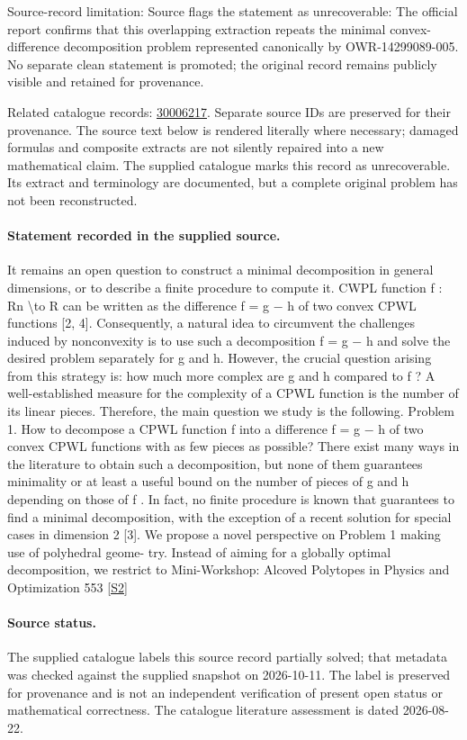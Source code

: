 \documentclass[11pt]{article}
\begin{document}
Source-record limitation: Source flags the statement as unrecoverable: The official report confirms that this overlapping extraction repeats the minimal convex-difference decomposition problem represented canonically by OWR-14299089-005. No separate clean statement is promoted; the original record remains publicly visible and retained for provenance.

Related catalogue records: \href{https://mehmetmars7.github.io/Erdosproblems-llm-hunter/problem.html?type=open_problems&id=30006217}{30006217}. Separate source IDs are preserved for their provenance.
The source text below is rendered literally where necessary; damaged formulas and composite extracts are not silently repaired into a new mathematical claim.
The supplied catalogue marks this record as unrecoverable. Its extract and terminology are documented, but a complete original problem has not been reconstructed.
\paragraph{Statement recorded in the supplied source.}
It remains an open question to construct a minimal decomposition in general dimensions, or to describe a finite procedure to compute it. CWPL function f : Rn \textbackslash{}to R can be written as the difference f = g − h of two convex CPWL functions [2, 4]. Consequently, a natural idea to circumvent the challenges induced by nonconvexity is to use such a decomposition f = g − h and solve the desired problem separately for g and h. However, the crucial question arising from this strategy is: how much more complex are g and h compared to f ? A well-established measure for the complexity of a CPWL function is the number of its linear pieces. Therefore, the main question we study is the following. Problem 1. How to decompose a CPWL function f into a difference f = g − h of two convex CPWL functions with as few pieces as possible? There exist many ways in the literature to obtain such a decomposition, but none of them guarantees minimality or at least a useful bound on the number of pieces of g and h depending on those of f . In fact, no finite procedure is known that guarantees to find a minimal decomposition, with the exception of a recent solution for special cases in dimension 2 [3]. We propose a novel perspective on Problem 1 making use of polyhedral geome- try. Instead of aiming for a globally optimal decomposition, we restrict to Mini-Workshop: Alcoved Polytopes in Physics and Optimization 553 \href{https://doi.org/10.4171/owr/2025/12}{[S2]}
\paragraph{Source status.}
The supplied catalogue labels this source record partially solved; that metadata was checked against the supplied snapshot on 2026-10-11. The label is preserved for provenance and is not an independent verification of present open status or mathematical correctness. The catalogue literature assessment is dated 2026-08-22.
\end{document}
